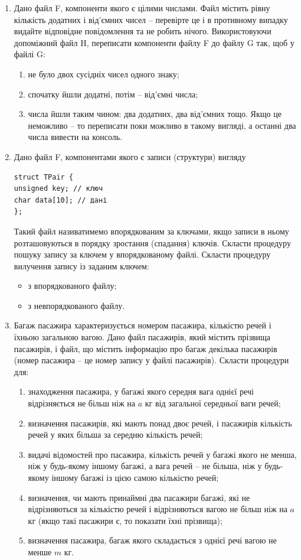 \documentclass[a5paper,titlepage,openany,twoside,
]
{book_unv}%
\makeatletter
\newcommand{\xslalph}[1]{\expandafter\@xslalph\csname c@#1\endcsname}
\newcommand{\@xslalph}[1]{%
    \ifcase#1\or а\or б\or в\or г\or д\or e\or є\or ж\or з\or i%
    \or й\or к\or л\or м\or н\or о\or п\or р\or с\or т%
    \or у\or ф\or х\or ц\or ч\or ш\or ю\or я\or аа\or бб\or вв%
    \else\@ctrerr\fi%
}
\makeatother
\begin{document}
\begin{enumerate}
\item
  Дано файл F, компоненти якого є цілими числами. Файл містить рівну
кількість додатних і від'ємних чисел -- перевірте це і в противному
  випадку видайте відповідне повідомлення та не робить нічого.
  Використовуючи допоміжний файл H, переписати компоненти файлу F до
  файлу G так, щоб у файлі G:
\begin{enumerate}[label=\xslalph*)]
\item
не було двох сусідніх чисел одного знаку;
\item
спочатку йшли додатні, потім -- від'ємні числа;
\item
числа йшли таким чином: два додатних, два від'ємних тощо. Якщо це
неможливо -- то переписати поки можливо в такому вигляді, а останні два
числа вивести на консоль.
\end{enumerate}

\item
  Дано файл F, компонентами якого є записи (структури) вигляду
\begin{verbatim}
struct TPair {
unsigned key; // ключ
char data[10]; // дані
};
\end{verbatim}

Такий файл називатимемо впорядкованим за ключами, якщо записи в ньому
розташовуються в порядку зростання (спадання) ключів. Скласти процедуру
пошуку запису за ключем у впорядкованому файлі. Скласти процедуру
вилучення запису із заданим ключем:
\begin{itemize}
\item з впорядкованого файлу;
\item з невпорядкованого файлу.
\end{itemize}

\item
  Багаж пасажира характеризується номером пасажира, кількістю речей і
  їхньою загальною вагою. Дано файл пасажирів, який містить прізвища
  пасажирів, і файл, що містить інформацію про багаж декілька пасажирів
  (номер пасажира -- це номер запису у файлі пасажирів). 
Скласти процедури для:
  \begin{enumerate}[label=\xslalph*)]
\item
знаходження пасажира, у багажі якого середня вага однієї речі
відрізняється не більш ніж на $a$ кг від загальної середньої ваги речей;
\item
визначення пасажирів, які мають понад двоє речей, і пасажирів
кількість речей у яких більша за середню кількість речей;
\item
видачі відомостей про пасажира, кількість речей у багажі якого не
менша, ніж у будь-якому іншому багажі, а вага речей -- не більша, ніж у
будь-якому іншому багажі із цією самою кількістю речей;
\item
визначення, чи мають принаймні два пасажири багажі, які не
відрізняються за кількістю речей і відрізняються вагою не більш ніж на $a$
кг (якщо такі пасажири є, то показати їхні прізвища);
\item визначення пасажира, багаж якого складається з однієї речі вагою не
менше $m$ кг.
  \end{enumerate}


\end{enumerate}
\end{document}
